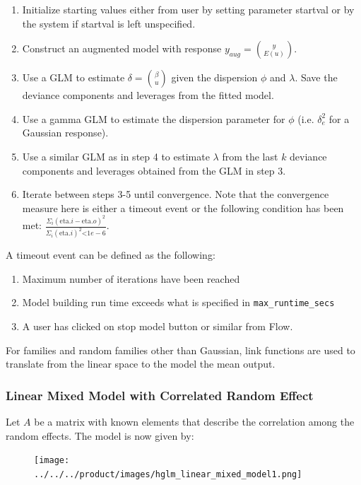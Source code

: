 \begin{enumerate}
    \item Initialize starting values either from user by setting parameter startval or by the system if startval is left unspecified.
    \item Construct an augmented model with response $y_{aug}= {y \choose {E(u)}}$.
    \item Use a GLM to estimate $\delta={\beta \choose u}$ given the dispersion $\phi$ and $\lambda$. Save the deviance components and leverages from the fitted model.
    \item Use a gamma GLM to estimate the dispersion parameter for $\phi$ (i.e. $\delta_e^2$ for a Gaussian response).
    \item Use a similar GLM as in step 4 to estimate $\lambda$ from the last $k$ deviance components and leverages obtained from the GLM in step 3.
    \item Iterate between steps 3-5 until convergence. Note that the convergence measure here is either a timeout event or the following condition has been met: $\frac {\Sigma_i{(\text{eta}. i - \text{eta}.o)^2}} {\Sigma_i(\text{eta}.i)^2 \text{<} 1e - 6}$.
\end{enumerate}
    
A timeout event can be defined as the following:

\begin{enumerate}
    \item Maximum number of iterations have been reached
    \item Model building run time exceeds what is specified in \texttt{max\_runtime\_secs}
    \item A user has clicked on stop model button or similar from Flow.
\end{enumerate}

For families and random families other than Gaussian, link functions are used to translate from the linear space to the model the mean output.

\subsubsection{Linear Mixed Model with Correlated Random Effect}

Let $A$ be a matrix with known elements that describe the correlation among the random effects. The model is now given by:

\begin{figure}[H]
\centering
\texttt{[image: ../../../product/images/hglm\_linear\_mixed\_model1.png]}
\end{figure}

